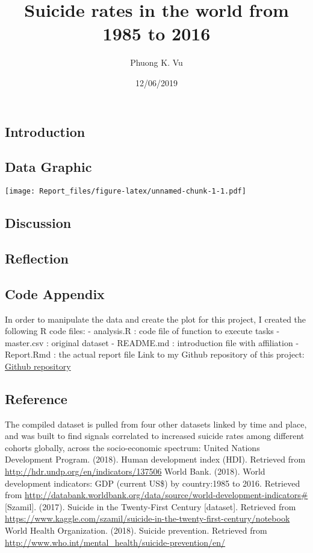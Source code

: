 \documentclass[]{article}
\title{Suicide rates in the world from 1985 to 2016}
\author{Phuong K. Vu}
\date{12/06/2019}
\begin{document}
\maketitle

\hypertarget{introduction}{%
\subsection{Introduction}\label{introduction}}

\hypertarget{data-graphic}{%
\subsection{Data Graphic}\label{data-graphic}}

\texttt{[image: Report\_files/figure-latex/unnamed-chunk-1-1.pdf]}

\hypertarget{discussion}{%
\subsection{Discussion}\label{discussion}}

\hypertarget{reflection}{%
\subsection{Reflection}\label{reflection}}

\hypertarget{code-appendix}{%
\subsection{Code Appendix}\label{code-appendix}}

In order to manipulate the data and create the plot for this project, I
created the following R code files: - analysis.R : code file of function
to execute tasks - master.csv : original dataset - README.md :
introduction file with affiliation - Report.Rmd : the actual report file
Link to my Github repository of this project:
\href{https://github.com/pvu-1864424/extra-credit.git}{Github
repository}

\hypertarget{reference}{%
\subsection{Reference}\label{reference}}

The compiled dataset is pulled from four other datasets linked by time
and place, and was built to find signals correlated to increased suicide
rates among different cohorts globally, across the socio-economic
spectrum: United Nations Development Program. (2018). Human development
index (HDI). Retrieved from
\url{http://hdr.undp.org/en/indicators/137506} World Bank. (2018). World
development indicators: GDP (current US\$) by country:1985 to 2016.
Retrieved from
\url{http://databank.worldbank.org/data/source/world-development-indicators\#}
{[}Szamil{]}. (2017). Suicide in the Twenty-First Century {[}dataset{]}.
Retrieved from
\url{https://www.kaggle.com/szamil/suicide-in-the-twenty-first-century/notebook}
World Health Organization. (2018). Suicide prevention. Retrieved from
\url{http://www.who.int/mental_health/suicide-prevention/en/}
\end{document}

